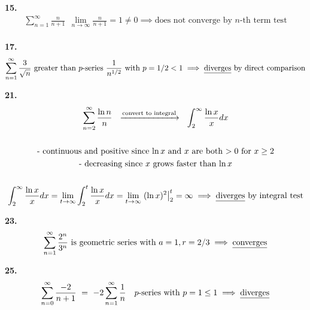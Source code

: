 \documentclass{article}
\begin{document}
\noindent
\textbf{
15.
}
\\
\begin{gather*}
\sum_{n=1}^{\infty} \frac{n}{n+1}
~~
\lim_{n \to \infty} \frac{n}{n+1}=1 \neq 0
\implies \text{does not converge by $n$-th term test}
\\
\end{gather*}



\noindent
\textbf{
17.
}
\\
\begin{gather*}
\sum_{n=1}^{\infty} \frac{3}{\sqrt{n}} \text{ greater than $p$-series } \frac{1}{n^{1/2}}
\text{ with } p=1/2<1
\implies \text{\underline{diverges} by direct comparison}
\\
\end{gather*}



\noindent
\textbf{
21.
}
\\
\begin{gather*}
\sum_{n=2}^{\infty} \frac{\ln n}{n}
~~\xrightarrow{\text{convert to integral}}~~
\int_2^{\infty} \frac{\ln x}{x}dx
\\
\\
\text{- continuous and positive since $\ln x$ and $x$ are both $>0$ for $x\geq 2$}
\\
\text{- decreasing since $x$ grows faster than $\ln x$}
\\
\\
\int_2^{\infty} \frac{\ln x}{x}dx
=\lim_{t \to \infty} \int_2^t \frac{\ln x}{x}dx
=\lim_{t \to \infty} \left. (\ln x)^2 \right|_2^t=\infty
\implies
\text{\underline{diverges} by integral test}
\\
\end{gather*}



\noindent
\textbf{
23.
}
\\
\begin{gather*}
\sum_{n=1}^{\infty} \frac{2^n}{3^n} \text{ is geometric series with }
a=1, r=2/3
\implies \text{\underline{converges}}
\\
\end{gather*}



\noindent
\textbf{
25.
}
\\
\begin{gather*}
\sum_{n=0}^{\infty} \frac{-2}{n+1}
~=~
-2 \sum_{n=1}^{\infty} \frac{1}{n}
~~
\text{ $p$-series with } p=1\leq 1
\implies \text{\underline{diverges}}
\\
\end{gather*}
\end{document}
